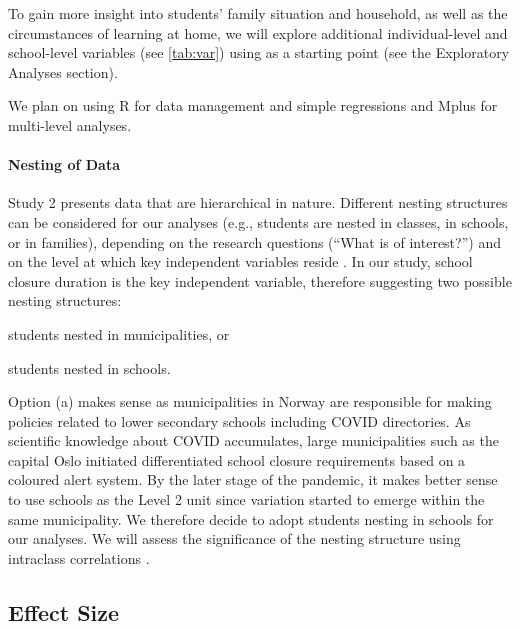 To gain more insight into students' family situation and household, as well as the circumstances of learning at home, we will explore additional individual-level and school-level variables (see \cref{tab:var}) using  as a starting point (see the Exploratory Analyses section).

We plan on using \textsf{R} \parencite{r} for data management and simple regressions and \textsf{Mplus} \parencite{mplus} for multi-level analyses.

\paragraph{Nesting of Data}

Study 2 presents data that are hierarchical in nature. Different nesting structures can be considered for our analyses (e.g., students are nested in classes, in schools, or in families), depending on the research questions (``What is of interest?'') and on the level at which key independent variables reside \parencite{scott:2013}. In our study, school closure duration is the key independent variable, therefore suggesting two possible nesting structures:
\begin{seriate}
    \item students nested in municipalities, or
    \item students nested in schools.
\end{seriate}%
Option (a) makes sense as municipalities in Norway are responsible for making policies related to lower secondary schools including COVID directories. As scientific knowledge about COVID accumulates, large municipalities such as the capital Oslo initiated differentiated school closure requirements based on a coloured alert system. By the later stage of the pandemic, it makes better sense to use schools as the Level 2 unit since variation started to emerge within the same municipality. We therefore decide to adopt students nesting in schools for our analyses. We will assess the significance of the nesting structure using intraclass correlations \parencite[$\text{ICC}_1$, ][]{ludtke:2009}.

\subsection{Effect Size}

